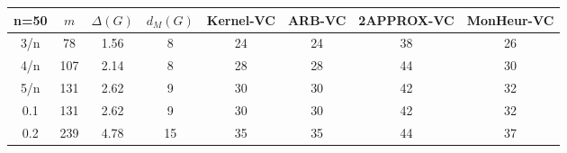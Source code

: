 \begin{tabular}{||c||ccc||cccc||}
 \hline \hline 
 n=50&$m$&$\Delta (G)$&$d_M(G)$& Kernel-VC & ARB-VC & 2APPROX-VC & MonHeur-VC\\ \hline \hline
3/n&78&1.56&8&24&24&38&26\\
4/n&107&2.14&8&28&28&44&30\\
5/n&131&2.62&9&30&30&42&32\\
0.1&131&2.62&9&30&30&42&32\\
0.2&239&4.78&15&35&35&44&37\\
\hline \end{tabular}

